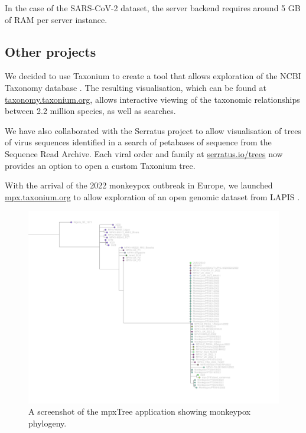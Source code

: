 In the case of the SARS-CoV-2 dataset, the server backend requires around 5 GB of RAM per server instance.

\subsection*{Other projects}

We decided to use Taxonium to create a tool that allows exploration of the NCBI Taxonomy database \citep{federhen2012ncbi}. The resulting visualisation, which can be found at \href{http://taxonomy.taxonium.org}{taxonomy.taxonium.org}, allows interactive viewing of the taxonomic relationships between 2.2 million species, as well as searches.


We have also collaborated with the Serratus project \citep{edgar2022petabase} to allow visualisation of trees of virus sequences identified in a search of petabases of sequence from the Sequence Read Archive. Each viral order and family at \href{http://serratus.io/trees}{serratus.io/trees} now provides an option to open a custom Taxonium tree.

With the arrival of the 2022 monkeypox outbreak in Europe, we launched \href{http://mpx.taxonium.org}{mpx.taxonium.org} to allow exploration of an open genomic dataset from LAPIS \citep{lapis}.



\begin{figure}
\begin{center}
\includegraphics[width=\linewidth]{Figures/taxonium (4).png}
\end{center}
\caption{
A screenshot of the mpxTree application showing monkeypox phylogeny. 
}
\label{fig:cov2tree}
\end{figure}

